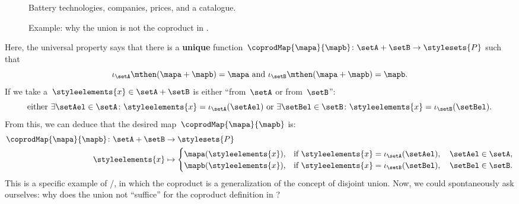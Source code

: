 \begin{example}
	\begin{figure*}[tbh]
		\centering
		\caption{Battery technologies, companies, prices, and a catalogue.}
		\label{fig:coprod_batteries_1}
	\end{figure*}

	\begin{figure*}[tbh]
		\centering
		\caption{Example: why the union is not the coproduct in \Set.}
		\label{fig:coprod_batteries_2}
	\end{figure*}

	Here, the universal property says that there is a \textbf{unique} function~$\coprodMap{\mapa}{\mapb}\colon \setA+\setB\to \stylesets{P}$ such that
	\begin{equation}
		\label{eq:exa-batt-factoring-maps}
		\iota_\setA\mthen (\mapa+ \mapb)=\mapa \text{ and }\iota_\setB\mthen (\mapa+ \mapb)=\mapb.
	\end{equation}
	If we take a~$\styleelements{x}\in \setA+\setB$ is either ``from~$\setA$ or from~$\setB$'':
	\begin{equation}
		\label{eq:exa-batt-explain-sum-map}
		\text{either } \exists \setAel\in \setA\colon \styleelements{x}=\iota_\setA(\setAel) \text{ or }\exists \setBel\in \setB\colon \styleelements{x}=\iota_\setB(\setBel).
	\end{equation}
	From this, we can deduce that the desired map~$\coprodMap{\mapa}{\mapb}$ is:
	\begin{equation}
		\label{eq:exa-batt-def-sum-map}
		\begin{aligned}
			\coprodMap{\mapa}{\mapb} \colon  \setA + \setB & \to \stylesets{P} \\
			\styleelements{x}                              & \mapsto
			\begin{cases}
				\mapa(\styleelements{x}), & \text{if } \styleelements{x}=\iota_\setA(\setAel),\quad \setAel \in \setA, \\
				\mapb(\styleelements{x}), & \text{if } \styleelements{x}=\iota_\setB(\setBel),\quad \setBel \in \setB.
			\end{cases}
		\end{aligned}
	\end{equation}
	This is a specific example of \Set/\FinSet, in which the coproduct is a generalization of the concept of disjoint union.
	Now, we could spontaneously ask ourselves: why does the union not ``suffice'' for the coproduct definition in \Set?

\end{example}

